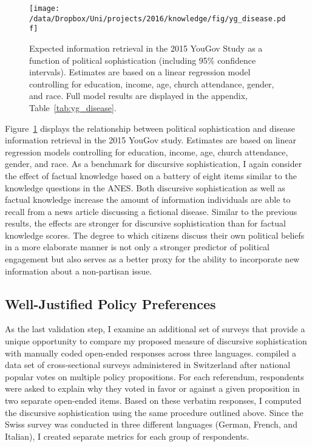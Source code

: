 \begin{figure}[h]\centering
\texttt{[image: /data/Dropbox/Uni/projects/2016/knowledge/fig/yg\_disease.pdf]}
\caption[Expected information retrieval in the 2015 YouGov Study as a function of political sophistication]{Expected information retrieval in the 2015 YouGov Study as a function of political sophistication (including 95\% confidence intervals). Estimates are based on a linear regression model controlling for education, income, age, church attendance, gender, and race. Full model results are displayed in the appendix, Table~\ref{tab:yg_disease}.}\label{fig:yg_disease}
\end{figure}

Figure~\ref{fig:yg_disease} displays the relationship between political sophistication and disease information retrieval in the 2015 YouGov study. Estimates are based on linear regression models controlling for education, income, age, church attendance, gender, and race. As a benchmark for discursive sophistication, I again consider the effect of factual knowledge based on a battery of eight items similar to the knowledge questions in the ANES. Both discursive sophistication as well as factual knowledge increase the amount of information individuals are able to recall from a news article discussing a fictional disease. Similar to the previous results, the effects are stronger for discursive sophistication than for factual knowledge scores. The degree to which citizens discuss their own political beliefs in a more elaborate manner is not only a stronger predictor of political engagement but also serves as a better proxy for the ability to incorporate new information about a non-partisan issue.


\subsection*{Well-Justified Policy Preferences}
As the last validation step, I examine an additional set of surveys that provide a unique opportunity to compare my proposed measure of discursive sophistication with manually coded open-ended responses across three languages.  \citet{colombo2016justifications} compiled a data set of cross-sectional surveys administered in Switzerland after national popular votes on multiple policy propositions. For each referendum, respondents were asked to explain why they voted in favor or against a given proposition in two separate open-ended items. Based on these verbatim responses, I computed the discursive sophistication using the same procedure outlined above. Since the Swiss survey was conducted in three different languages (German, French, and Italian), I created separate metrics for each group of respondents.

